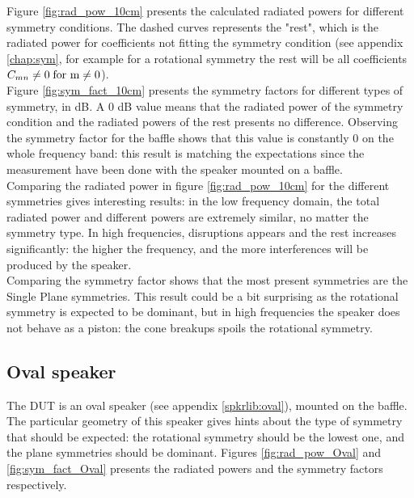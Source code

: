 \documentclass{report}
\begin{document}
Figure \ref{fig:rad_pow_10cm} presents the calculated radiated powers for different symmetry conditions. The dashed curves represents the "rest", which is the radiated power for coefficients not fitting the symmetry condition (see appendix \ref{chap:sym}, for example for a rotational symmetry the rest will be all coefficients $C_{mn} \neq 0 \;  \textup{for m}  \neq 0$). \\

Figure \ref{fig:sym_fact_10cm} presents the symmetry factors for different types of symmetry, in dB. A 0 dB value means that the radiated power of the symmetry condition and the radiated powers of the rest presents no difference. Observing the symmetry factor for the baffle shows that this value is constantly 0 on the whole frequency band: this result is matching the expectations since the measurement have been done with the speaker mounted on a baffle. \\

Comparing the radiated power in figure \ref{fig:rad_pow_10cm} for the different symmetries gives interesting results: in the low frequency domain, the total radiated power and different powers are extremely similar, no matter the symmetry type. In high frequencies, disruptions appears and the rest increases significantly: the higher the frequency, and the more interferences will be produced by the speaker. \\

Comparing the symmetry factor shows that the most present symmetries are the Single Plane symmetries. This result could be a bit surprising as the rotational symmetry is expected to be dominant, but in high frequencies the speaker does not behave as a piston: the cone breakups spoils the rotational symmetry. 

\subsection{Oval speaker}
The DUT is an oval speaker (see appendix \ref{spkrlib:oval}), mounted on the baffle. The particular geometry of this speaker gives hints about the type of symmetry that should be expected: the rotational symmetry should be the lowest one, and the plane symmetries should be dominant.  Figures \ref{fig:rad_pow_Oval} and \ref{fig:sym_fact_Oval} presents the radiated powers and the symmetry factors respectively.\\
\end{document}
